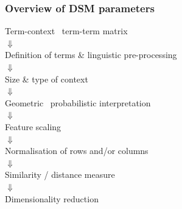 \begin{frame}
  \frametitle{Overview of DSM parameters}

  \ungap[1]
  \begin{center}
    Term-context \vs\ term-term matrix\\
    $\Downarrow$\\
    Definition of terms \& linguistic pre-processing\\
    $\Downarrow$\\
    Size \& type of context\\
    $\Downarrow$\\
    Geometric \vs\ probabilistic interpretation\\
    $\Downarrow$\\
    Feature scaling\\
    $\Downarrow$\\
    Normalisation of rows and/or columns\\
    $\Downarrow$\\
    Similarity / distance measure\\
    $\Downarrow$\\
    \h{Dimensionality reduction}
  \end{center}
\end{frame}


